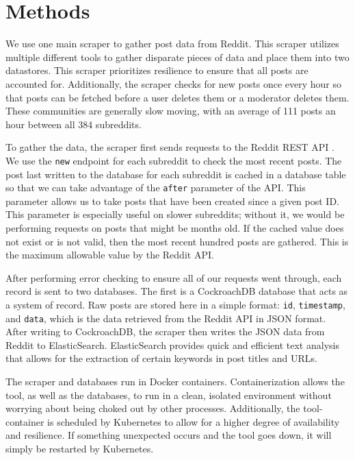 \documentclass[12pt,oneside, letterpaper]{book}
\begin{document}
\section{Methods}
\par We use one main scraper to gather post data from Reddit. This scraper utilizes multiple different tools to gather disparate pieces of data and place them into two datastores. This scraper prioritizes resilience to ensure that all posts are accounted for. Additionally, the scraper checks for new posts once every hour so that posts can be fetched before a user deletes them or a moderator deletes them. These communities are generally slow moving, with an average of 111 posts an hour between all 384 subreddits.

\par To gather the data, the scraper first sends requests to the Reddit REST API \cite{reddit}. We use the \texttt{new} endpoint for each subreddit to check the most recent posts. The post last written to the database for each subreddit is cached in a database table so that we can take advantage of the \texttt{after} parameter of the API. This parameter allows us to take posts that have been created since a given post ID. This parameter is especially useful on slower subreddits; without it, we would be performing requests on posts that might be months old. If the cached value does not exist or is not valid, then the most recent hundred posts are gathered. This is the maximum allowable value by the Reddit API.

\par After performing error checking to ensure all of our requests went through, each record is sent to two databases. The first is a CockroachDB database that acts as a system of record. Raw posts are stored here in a simple format: \texttt{id}, \texttt{timestamp}, and \texttt{data}, which is the data retrieved from the Reddit API in JSON format. After writing to CockroachDB, the scraper then writes the JSON data from Reddit to ElasticSearch. ElasticSearch provides quick and efficient text analysis that allows for the extraction of certain keywords in post titles and URLs.

\par The scraper and databases run in Docker containers. Containerization allows the tool, as well as the databases, to run in a clean, isolated environment without worrying about being choked out by other processes. Additionally, the tool-container is scheduled by Kubernetes to allow for a higher degree of availability and resilience. If something unexpected occurs and the tool goes down, it will simply be restarted by Kubernetes.
\end{document}
